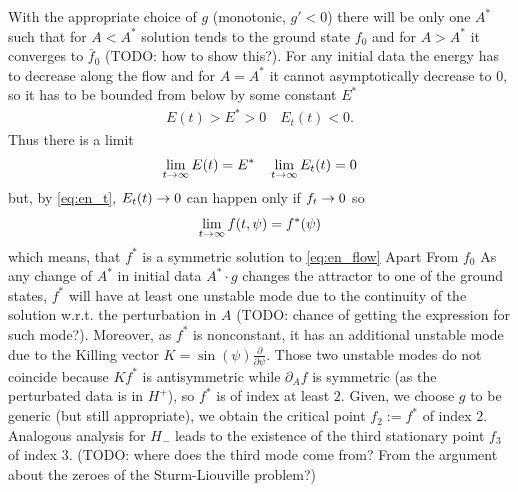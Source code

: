 With the appropriate choice of $g$ (monotonic, $g'<0$) there will be
only one $A^*$ such that for $A<A^*$ solution tends to the ground
state $f_0$ and for $A>A^*$ it converges to $\bar{f}_0$ (TODO: how to
show this?). For any initial data the energy has to decrease along the
flow and for $A=A^*$ it cannot asymptotically decrease to $0$, so it
has to be bounded from below by some constant $E^*$
\begin{align}
  E(t)>E^*>0\quad E_t(t)<0.
\end{align}
Thus there is a limit
\begin{align}
  \lim_{t\rightarrow\infty}E(t)=E^*\quad \lim_{t\rightarrow\infty}E_t(t)=0
\end{align}
but, by \eqref{eq:en_t}, $E_t(t)\rightarrow0$ can happen only if $f_t\rightarrow0$ so
\begin{align}
  \lim_{t\rightarrow\infty}f(t,\psi)=f^*(\psi)
\end{align}
which means, that $f^*$ is a symmetric solution to \eqref{eq:en_flow}
Apart From $f_0$ As any change of $A^*$ in initial data $A^*\cdot g$
changes the attractor to one of the ground states, $f^*$ will have at
least one unstable mode due to the continuity of the solution
w.r.t. the perturbation in $A$ (TODO: chance of getting the expression
for such mode?). Moreover, as $f^*$ is nonconstant, it has an
additional unstable mode due to the Killing vector
$K=\sin(\psi)\frac{\partial}{\partial\psi}$. Those two unstable modes
do not coincide because $Kf^*$ is antisymmetric while $\partial_A f$
is symmetric (as the perturbated data is in $H^+$), so $f^*$ is of
index at least $2$. Given, we choose $g$ to be generic (but still
appropriate), we obtain the critical point $f_2:=f^*$ of index
$2$.\\
Analogous analysis for $H_-$ leads to the existence of the third
stationary point $f_3$ of index $3$. (TODO: where does the third mode
come from? From the argument about the zeroes of the Sturm-Liouville
problem?)


